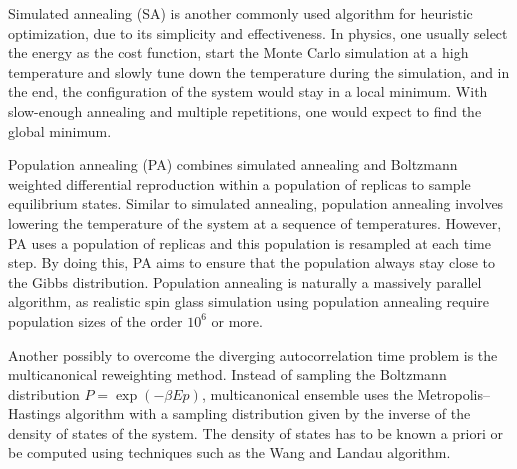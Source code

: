Simulated annealing (SA) is another commonly used algorithm for heuristic optimization,
due to its simplicity and effectiveness. In physics, one usually select the 
energy as the cost function, start the Monte Carlo simulation at a high temperature
and slowly tune down the temperature during the simulation, and in the end, the
configuration of the system would stay in a local minimum. With slow-enough annealing
and multiple repetitions, one would expect to find the global minimum.  

Population annealing (PA) combines simulated annealing and Boltzmann weighted 
differential reproduction within a population of replicas to sample equilibrium 
states. Similar to simulated annealing, population annealing involves lowering 
the temperature of the system at a sequence of temperatures. However, PA uses a 
population of replicas and this population is resampled at each time step.
By doing this, PA aims to ensure that the population always stay close to the 
Gibbs distribution. Population annealing is naturally a massively
parallel algorithm, as realistic spin glass simulation using population 
annealing require population sizes of the order $10^6$ or more.

Another possibly to overcome the diverging autocorrelation time problem is the 
multicanonical reweighting method. Instead of sampling the Boltzmann 
distribution $P=\exp(-\beta Ep)$, multicanonical ensemble uses the 
Metropolis–Hastings algorithm with a sampling distribution given by the inverse 
of the density of states of the system. The density of states has to be known 
a priori or be computed using techniques such as the Wang and Landau algorithm.






